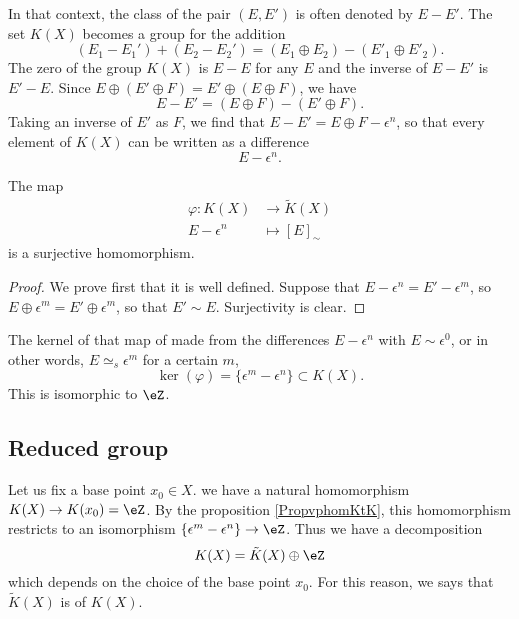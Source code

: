 In that context, the class of the pair $(E,E')$ is often denoted by $E-E'$. The set $K(X)$ becomes a group for the addition
\begin{equation}
(E_1-E_1')+(E_2-E_2')=(E_1\oplus E_2)-(E'_1\oplus E'_2).
\end{equation}
The zero of the group $K(X)$ is $E-E$ for any $E$ and the inverse of $E-E'$ is $E'-E$. Since $E\oplus(E'\oplus F)=E'\oplus(E\oplus F)$, we have
\begin{equation}
E-E'=(E\oplus F)-(E'\oplus F).
\end{equation}
Taking an inverse of $E'$ as $F$, we find that $E-E'=E\oplus F-\epsilon^n$, so that every element of $K(X)$ can be written as a difference 
\[ 
E-\epsilon^n. 
\]

\begin{proposition}		\label{PropvphomKtK}
The map
\begin{equation}
\begin{aligned}
 \varphi\colon K(X)&\to \tilde K(X) \\ 
   E-\epsilon^n&\mapsto [E]_{\sim} 
\end{aligned}
\end{equation}
is a surjective homomorphism.
\end{proposition}

\begin{proof}
We prove first that it is well defined. Suppose that $E-\epsilon^n=E'-\epsilon^m$, so $E\oplus \epsilon^m=E'\oplus \epsilon^m$, so that $E'\sim E$. Surjectivity is clear.
\end{proof}

The kernel of that map of made from the differences $E-\epsilon^n$ with $E\sim \epsilon^0$, or in other words, $E\simeq_s\epsilon^m$ for a certain $m$,
\begin{equation}
\ker(\varphi)=\{ \epsilon^m-\epsilon^n \}\subset K(X).
\end{equation}
This is isomorphic to $\eZ$.

					\subsection{Reduced group}

Let us fix a base point $x_0\in X$. we have a natural homomorphism $K(X)\to K(x_0)=\eZ$. By the proposition \ref{PropvphomKtK}, this homomorphism restricts to an isomorphism $\{ \epsilon^m-\epsilon^n \}\to \eZ$. Thus we have a decomposition
\begin{equation}
		K(X)=\tilde K(X)\oplus\eZ
\end{equation}
which depends on the choice of the base point $x_0$. For this reason, we says that $\tilde K(X)$ is  of $K(X)$.

